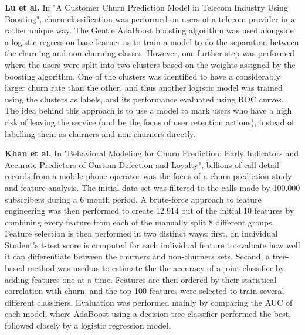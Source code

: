 \documentclass{kththesis}
\begin{document}
\textbf{Lu et al.} \citep{Lu2014} In "A Customer Churn Prediction Model in Telecom Industry Using Boosting", churn classification was performed on users of a telecom provider in a rather unique way. The Gentle AdaBoost boosting algorithm was used alongside a logistic regression base learner as to train a model to do the separation between the churning and non-churning classes. However, one further step was performed where the users were split into two clusters based on the weights assigned by the boosting algorithm. One of the clusters was identified to have a considerably larger churn rate than the other, and thus another logistic model was trained using the clusters as labels, and its performance evaluated using ROC curves. The idea behind this approach is to use a model to mark users who have a high risk of leaving the service (and be the focus of user retention actions), instead of labelling them as churners and non-churners directly.

\textbf{Khan et al.} \citep{Khan2015} In "Behavioral Modeling for Churn Prediction: Early Indicators and Accurate Predictors of Custom Defection and Loyalty", billions of call detail records from a mobile phone operator was the focus of a churn prediction study and feature analysis. The initial data set was filtered to the calls made by 100.000 subscribers during a 6 month period. A brute-force approach to feature engineering was then performed to create 12.914 out of the initial 10 features by combining every feature from each of the manually split 8 different groups. Feature selection is then performed in two distinct ways: first, an individual Student's t-test score is computed for each individual feature to evaluate how well it can differentiate between the churners and non-churners sets. Second, a tree-based method was used as to estimate the the accuracy of a joint classifier by adding features one at a time. Features are then ordered by their statistical correlation with churn, and the top 100 features were selected to train several different classifiers. Evaluation was performed mainly by comparing the AUC of each model, where AdaBoost using a decision tree classifier performed the best, followed closely by a logistic regression model.
\end{document}

